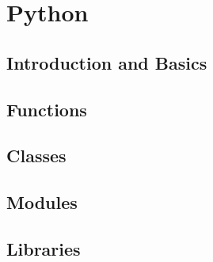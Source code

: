 \part{Python}

\chapter{Introduction and Basics}





\chapter{Functions}





\chapter{Classes}




\chapter{Modules}




\chapter{Libraries}




